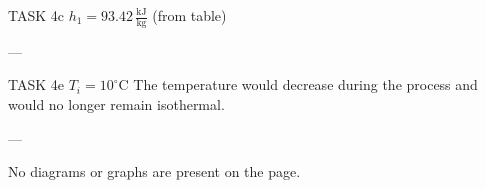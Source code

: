 TASK 4c  
\( h_1 = 93.42 \, \frac{\text{kJ}}{\text{kg}} \) (from table)

---

TASK 4e  
\( T_i = 10^\circ\text{C} \)  
The temperature would decrease during the process and would no longer remain isothermal.  

---

No diagrams or graphs are present on the page.